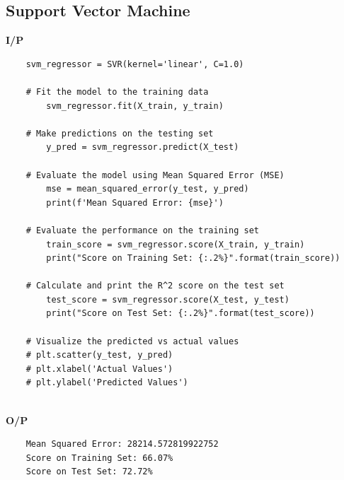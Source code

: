 \subsection{Support Vector Machine}
\noindent
\textbf{I/P} \\[-1.5em]
\begin{verbatim}
    svm_regressor = SVR(kernel='linear', C=1.0) 
 
    # Fit the model to the training data 
        svm_regressor.fit(X_train, y_train) 
 
    # Make predictions on the testing set 
        y_pred = svm_regressor.predict(X_test) 
 
    # Evaluate the model using Mean Squared Error (MSE) 
        mse = mean_squared_error(y_test, y_pred) 
        print(f'Mean Squared Error: {mse}') 
 
    # Evaluate the performance on the training set 
        train_score = svm_regressor.score(X_train, y_train) 
        print("Score on Training Set: {:.2%}".format(train_score)) 
 
    # Calculate and print the R^2 score on the test set 
        test_score = svm_regressor.score(X_test, y_test) 
        print("Score on Test Set: {:.2%}".format(test_score)) 
 
    # Visualize the predicted vs actual values 
    # plt.scatter(y_test, y_pred) 
    # plt.xlabel('Actual Values') 
    # plt.ylabel('Predicted Values') 
\end{verbatim}
\\
\noindent
\textbf{O/P} \\[-1.5em]
\begin{verbatim}
    Mean Squared Error: 28214.572819922752 
    Score on Training Set: 66.07% 
    Score on Test Set: 72.72%  
\end{verbatim}

